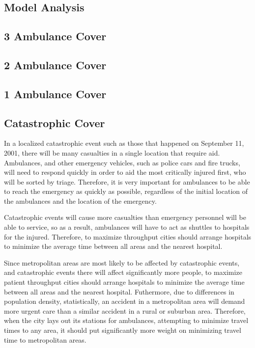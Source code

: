 \documentclass[notitlepage, 12pt]{article}
\begin{document}
\begin{enumerate}
\section{Model Analysis}

\subsection{3 Ambulance Cover}

\subsection{2 Ambulance Cover}

\subsection{1 Ambulance Cover}

\subsection{Catastrophic Cover}
In a localized catastrophic event such as those that happened on September 11, 2001, there will be
many casualties in a single location that require aid. Ambulances, and other emergency vehicles,
such as police cars and fire trucks, will need to respond quickly in order to aid the most critically
injured first, who will be sorted by triage. Therefore, it is very important for ambulances to be able to
reach the emergency as quickly as possible, regardless of the initial location of the ambulances and the
location of the emergency.

Catastrophic events will cause more casualties than emergency personnel will be able to service, so as a result,
ambulances will have to act as shuttles to hospitals for the injured. Therefore, to maximize throughput
cities should arrange hospitals to minimize the average time between all areas and the nearest
hospital.

Since metropolitan areas are most likely to be affected by catastrophic events, and catastrophic events there
will affect significantly more people, to maximize patient throughput cities should arrange hospitals to minimize
the average time between all areas and the nearest hospital. Futhermore, due to differences in population density,
statistically, an accident in a metropolitan area will demand more urgent care than a similar accident
in a rural or suburban area. Therefore, when the city lays out its stations for ambulances, attempting to minimize
travel times to any area, it should put significantly more weight on minimizing travel time to metropolitan areas.


\end{enumerate}
\end{document}
